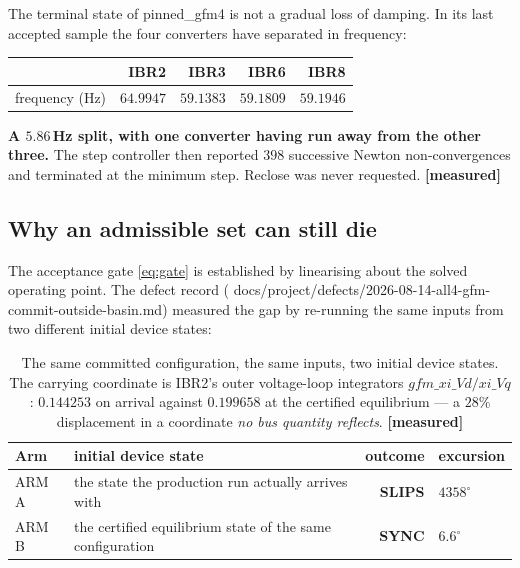\documentclass[12pt,a4paper]{article}
\theoremstyle{remark}
\newcommand{\code}[1]{{\ttfamily\small\hyphenchar\font=-1 #1}}
\newcommand{\measured}{\textcolor{ok}{\textbf{[measured]}}}
\begin{document}
The terminal state of \code{pinned\_gfm4} is not a gradual loss of damping. In
its last accepted sample the four converters have separated in frequency:

\begin{center}\small
\begin{tabular}{@{}lrrrr@{}}
\toprule
& IBR2 & IBR3 & IBR6 & IBR8\\
\midrule
frequency (Hz) & $\mathbf{64.9947}$ & $59.1383$ & $59.1809$ & $59.1946$\\
\bottomrule
\end{tabular}
\end{center}

\noindent
\textbf{A $5.86$\,Hz split, with one converter having run away from the other
three.} The step controller then reported $398$ successive Newton
non-convergences and terminated at the minimum step. Reclose was never
requested. \measured

\subsection{Why an admissible set can still die}

The acceptance gate \eqref{eq:gate} is established by linearising about the
solved operating point. The defect record
(\code{docs/project/defects/2026-08-14-all4-gfm-commit-outside-basin.md})
measured the gap by re-running the same inputs from two different initial device
states:

\begin{table}[H]
\centering
\small
\begin{tabular}{@{}llrl@{}}
\toprule
\textbf{Arm} & \textbf{initial device state} & \textbf{outcome} & \textbf{excursion}\\
\midrule
ARM A & the state the production run actually arrives with & \textcolor{no}{\textbf{SLIPS}} & $4358^{\circ}$\\
ARM B & the certified equilibrium state of the same configuration & \textbf{SYNC} & $6.6^{\circ}$\\
\bottomrule
\end{tabular}
\caption{The same committed configuration, the same inputs, two initial device
states. The carrying coordinate is IBR2's outer voltage-loop integrators
$gfm\_xi\_Vd/xi\_Vq$: $0.144253$ on arrival against $0.199658$ at the certified
equilibrium --- a $28\%$ displacement in a coordinate \emph{no bus quantity
reflects}. \measured}
\label{tab:arm}
\end{table}
\end{document}
